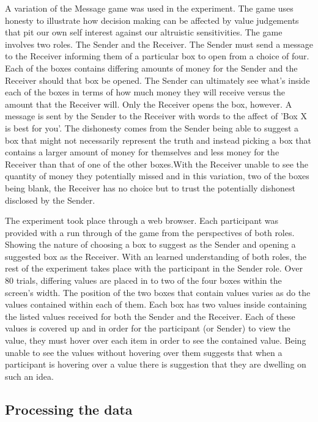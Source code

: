 \documentclass[man, floatsintext]{apa7}
\begin{document}
A variation of the Message game was used in the experiment. The game uses honesty to illustrate how decision making can be affected by value judgements that pit our own self interest against our altruistic sensitivities. The game involves two roles. The Sender and the Receiver. The Sender must send a message to the Receiver informing them of a particular box to open from a choice of four. Each of the boxes contains differing amounts of money for the Sender and the Receiver should that box be opened. The Sender can ultimately see what's inside each of the boxes in terms of how much money they will receive versus the amount that the Receiver will. Only the Receiver opens the box, however. A message is sent by the Sender to the Receiver with words to the affect of 'Box X is best for you'. The dishonesty comes from the Sender being able to suggest a box that might not necessarily represent the truth and instead picking a box that contains a larger amount of money for themselves and less money for the Receiver than that of one of the other boxes.With the Receiver unable to see the quantity of money they potentially missed and in this variation, two of the boxes being blank, the Receiver has no choice but to trust the potentially dishonest disclosed by the Sender.

The experiment took place through a web browser. Each participant was provided with a run through of the game from the perspectives of both roles. Showing the nature of choosing a box to suggest as the Sender and opening a suggested box as the Receiver. With an learned understanding of both roles, the rest of the experiment takes place with the participant in the Sender role. Over 80 trials, differing values are placed in to two of the four boxes within the screen's width. The position of the two boxes that contain values varies as do the values contained within each of them. Each box has two values inside containing the listed values received for both the Sender and the Receiver. Each of these values is covered up and in order for the participant (or Sender) to view the value, they must hover over each item in order to see the contained value. Being unable to see the values without hovering over them suggests that when a participant is hovering over a value there is suggestion that they are dwelling on such an idea.


\subsection{Processing the data}
\end{document}
